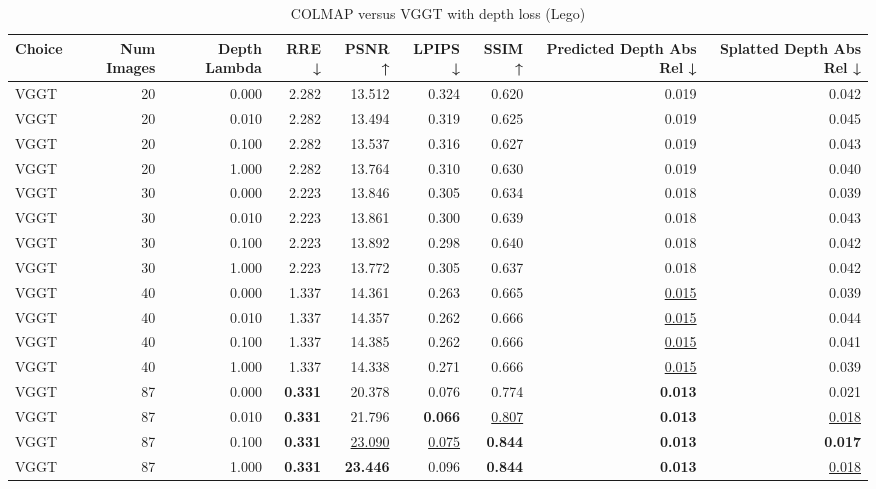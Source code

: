 \begin{table}[H]
\caption{COLMAP versus VGGT with depth loss (Lego)}
\label{tab:05_depth_lambda_num_images_lego}
\small
\begin{tabular}{lrrrrrrrr}
\toprule
Choice & Num Images & Depth Lambda & RRE ↓ & PSNR ↑ & LPIPS ↓ & SSIM ↑ & Predicted Depth Abs Rel ↓ & Splatted Depth Abs Rel ↓ \\
\midrule
VGGT & 20 & 0.000 & 2.282 & 13.512 & 0.324 & 0.620 & 0.019 & 0.042 \\
VGGT & 20 & 0.010 & 2.282 & 13.494 & 0.319 & 0.625 & 0.019 & 0.045 \\
VGGT & 20 & 0.100 & 2.282 & 13.537 & 0.316 & 0.627 & 0.019 & 0.043 \\
VGGT & 20 & 1.000 & 2.282 & 13.764 & 0.310 & 0.630 & 0.019 & 0.040 \\
VGGT & 30 & 0.000 & 2.223 & 13.846 & 0.305 & 0.634 & 0.018 & 0.039 \\
VGGT & 30 & 0.010 & 2.223 & 13.861 & 0.300 & 0.639 & 0.018 & 0.043 \\
VGGT & 30 & 0.100 & 2.223 & 13.892 & 0.298 & 0.640 & 0.018 & 0.042 \\
VGGT & 30 & 1.000 & 2.223 & 13.772 & 0.305 & 0.637 & 0.018 & 0.042 \\
VGGT & 40 & 0.000 & 1.337 & 14.361 & 0.263 & 0.665 & \underline{0.015} & 0.039 \\
VGGT & 40 & 0.010 & 1.337 & 14.357 & 0.262 & 0.666 & \underline{0.015} & 0.044 \\
VGGT & 40 & 0.100 & 1.337 & 14.385 & 0.262 & 0.666 & \underline{0.015} & 0.041 \\
VGGT & 40 & 1.000 & 1.337 & 14.338 & 0.271 & 0.666 & \underline{0.015} & 0.039 \\
VGGT & 87 & 0.000 & \textbf{0.331} & 20.378 & 0.076 & 0.774 & \textbf{0.013} & 0.021 \\
VGGT & 87 & 0.010 & \textbf{0.331} & 21.796 & \textbf{0.066} & \underline{0.807} & \textbf{0.013} & \underline{0.018} \\
VGGT & 87 & 0.100 & \textbf{0.331} & \underline{23.090} & \underline{0.075} & \textbf{0.844} & \textbf{0.013} & \textbf{0.017} \\
VGGT & 87 & 1.000 & \textbf{0.331} & \textbf{23.446} & 0.096 & \textbf{0.844} & \textbf{0.013} & \underline{0.018} \\
\bottomrule
\end{tabular}
\end{table}